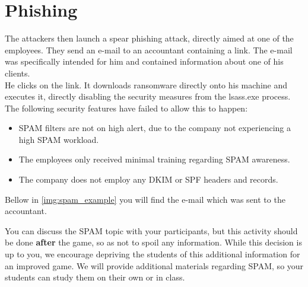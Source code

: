 \section{Phishing}

The attackers then launch a spear phishing attack, directly aimed at one of the employees.
They send an e-mail to an accountant containing a link.
The e-mail was specifically intended for him and contained information about one of his clients.
\\

He clicks on the link.
It downloads ransomware directly onto his machine and executes it, directly disabling the security measures from the lsass.exe process.
\\

The following security features have failed to allow this to happen:

\begin{itemize}
    \item SPAM filters are not on high alert, due to the company not experiencing a high SPAM workload.
    \item The employees only received minimal training regarding SPAM awareness.
    \item The company does not employ any DKIM or SPF headers and records.
\end{itemize}

Bellow in \autoref{img:spam_example} 
you will find the e-mail which was sent to the accountant.

\begin{hint}
    You can discuss the SPAM topic with your participants, but this activity should be done \textbf{after} the game, so as not to spoil any information.
    While this decision is up to you, we encourage depriving the students of this additional information for an improved game.
    We will provide additional materials regarding SPAM, so your students can study them on their own or in class.
\end{hint}